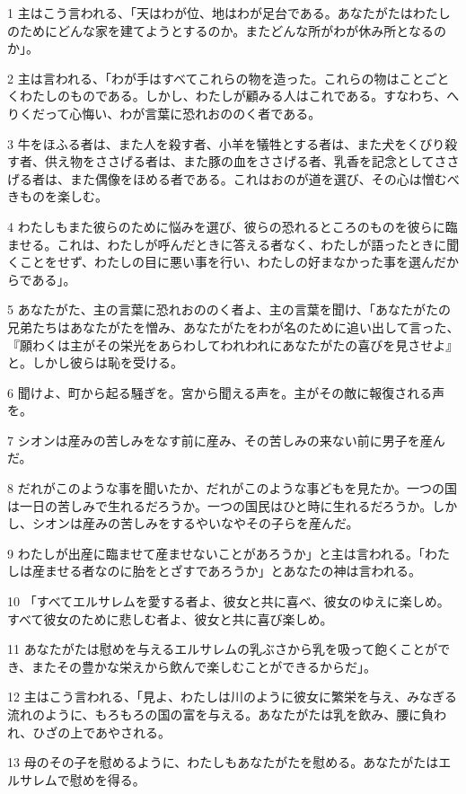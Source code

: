 \par 1 主はこう言われる、「天はわが位、地はわが足台である。あなたがたはわたしのためにどんな家を建てようとするのか。またどんな所がわが休み所となるのか」。
\par 2 主は言われる、「わが手はすべてこれらの物を造った。これらの物はことごとくわたしのものである。しかし、わたしが顧みる人はこれである。すなわち、へりくだって心悔い、わが言葉に恐れおののく者である。
\par 3 牛をほふる者は、また人を殺す者、小羊を犠牲とする者は、また犬をくびり殺す者、供え物をささげる者は、また豚の血をささげる者、乳香を記念としてささげる者は、また偶像をほめる者である。これはおのが道を選び、その心は憎むべきものを楽しむ。
\par 4 わたしもまた彼らのために悩みを選び、彼らの恐れるところのものを彼らに臨ませる。これは、わたしが呼んだときに答える者なく、わたしが語ったときに聞くことをせず、わたしの目に悪い事を行い、わたしの好まなかった事を選んだからである」。
\par 5 あなたがた、主の言葉に恐れおののく者よ、主の言葉を聞け、「あなたがたの兄弟たちはあなたがたを憎み、あなたがたをわが名のために追い出して言った、『願わくは主がその栄光をあらわしてわれわれにあなたがたの喜びを見させよ』と。しかし彼らは恥を受ける。
\par 6 聞けよ、町から起る騒ぎを。宮から聞える声を。主がその敵に報復される声を。
\par 7 シオンは産みの苦しみをなす前に産み、その苦しみの来ない前に男子を産んだ。
\par 8 だれがこのような事を聞いたか、だれがこのような事どもを見たか。一つの国は一日の苦しみで生れるだろうか。一つの国民はひと時に生れるだろうか。しかし、シオンは産みの苦しみをするやいなやその子らを産んだ。
\par 9 わたしが出産に臨ませて産ませないことがあろうか」と主は言われる。「わたしは産ませる者なのに胎をとざすであろうか」とあなたの神は言われる。
\par 10 「すべてエルサレムを愛する者よ、彼女と共に喜べ、彼女のゆえに楽しめ。すべて彼女のために悲しむ者よ、彼女と共に喜び楽しめ。
\par 11 あなたがたは慰めを与えるエルサレムの乳ぶさから乳を吸って飽くことができ、またその豊かな栄えから飲んで楽しむことができるからだ」。
\par 12 主はこう言われる、「見よ、わたしは川のように彼女に繁栄を与え、みなぎる流れのように、もろもろの国の富を与える。あなたがたは乳を飲み、腰に負われ、ひざの上であやされる。
\par 13 母のその子を慰めるように、わたしもあなたがたを慰める。あなたがたはエルサレムで慰めを得る。
